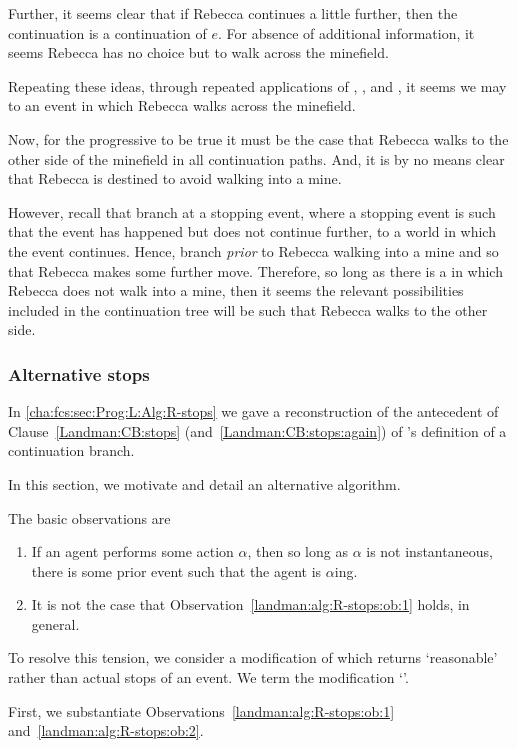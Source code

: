 \begin{note}
  Further, it seems clear that if Rebecca continues a little further, then the continuation is a continuation of \(e\).
  For absence of additional information, it seems Rebecca has no choice but to walk across the minefield.

  Repeating these ideas, through repeated applications of \AlgAC{}, \AlgGetStops{}, and \AlgFindBranches{}, it seems we may \drift{} to an event in which Rebecca walks across the minefield.
\end{note}

\begin{note}
  Now, for the progressive to be true it must be the case that Rebecca walks to the other side of the minefield in all continuation paths.
  And, it is by no means clear that Rebecca is destined to avoid walking into a mine.

  However, recall that branch at a stopping event, where a stopping event is such that the event has happened but does not continue further, to a world in which the event continues.
  Hence, branch \emph{prior} to Rebecca walking into a mine and so that Rebecca makes some further move.
  Therefore, so long as there is a  in which Rebecca does not walk into a mine, then it seems the relevant possibilities included in the continuation tree will be such that Rebecca walks to the other side.
\end{note}

\subsubsection{Alternative stops}
\label{cha:fcs:sec:Prog:L:Alg:R-stops}

\begin{note}
  In \autoref{cha:fcs:sec:Prog:L:Alg:R-stops} we gave a reconstruction of the antecedent of Clause~\ref{Landman:CB:stops} (and~\ref{Landman:CB:stops:again}) of \citeauthor{Landman:1992wh}'s definition of a continuation branch.

  In this section, we motivate and detail an alternative algorithm.

  The basic observations are
  \begin{enumerate}[label=\arabic*., ref=(\arabic*), noitemsep]
  \item
    \label{landman:alg:R-stops:ob:1}
    If an agent performs some action \(\alpha\), then so long as \(\alpha\) is not instantaneous, there is some prior event such that the agent is \(\alpha\)ing.
  \item
    \label{landman:alg:R-stops:ob:2}
    It is not the case that Observation~\ref{landman:alg:R-stops:ob:1} holds, in general.
  \end{enumerate}
  To resolve this tension, we consider a modification of \AlgGetStops{} which returns `reasonable' rather than actual stops of an event.
  We term the modification `\AlgGetPStops{}'.

  First, we substantiate Observations~\ref{landman:alg:R-stops:ob:1} and~\ref{landman:alg:R-stops:ob:2}.
\end{note}

